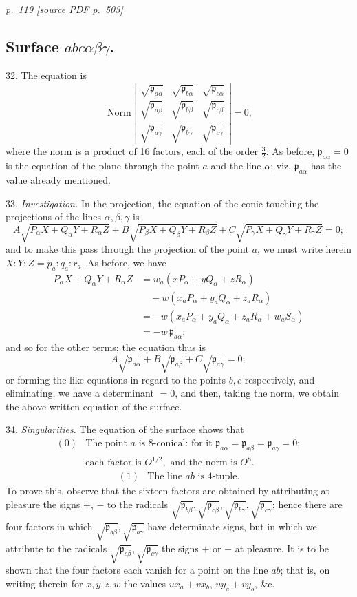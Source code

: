 \documentclass[11pt,a4paper]{article}
\newcommand{\sourcepage}[2]{%
  \bigskip
  \noindent\textit{p.~#1 [source PDF p.~#2]}%
  \par\smallskip
}
\newcommand{\p}{\mathfrak p}
\newcommand{\Norm}{\operatorname{Norm}}
\begin{document}
\sourcepage{119}{503}
\subsection*{Surface \(abc\alpha\beta\gamma\).}

32. The equation is
\[
\Norm\left|
\begin{array}{ccc}
\sqrt{\p_{a\alpha}}&\sqrt{\p_{b\alpha}}&\sqrt{\p_{c\alpha}}\\
\sqrt{\p_{a\beta}}&\sqrt{\p_{b\beta}}&\sqrt{\p_{c\beta}}\\
\sqrt{\p_{a\gamma}}&\sqrt{\p_{b\gamma}}&\sqrt{\p_{c\gamma}}
\end{array}\right|=0,
\]
where the norm is a product of 16 factors, each of the order $\frac32$. As before,
$\p_{a\alpha}=0$ is the equation of the plane through the point $a$ and the line
$\alpha$; viz. $\p_{a\alpha}$ has the value already mentioned.

33. \textit{Investigation.} In the projection, the equation of the conic touching the
projections of the lines $\alpha,\beta,\gamma$ is
\[
A\sqrt{P_\alpha X+Q_\alpha Y+R_\alpha Z}
+B\sqrt{P_\beta X+Q_\beta Y+R_\beta Z}
+C\sqrt{P_\gamma X+Q_\gamma Y+R_\gamma Z}=0;
\]
and to make this pass through the projection of the point $a$, we must write herein
$X:Y:Z=p_a:q_a:r_a$. As before, we have
\[
\begin{aligned}
P_\alpha X+Q_\alpha Y+R_\alpha Z
&=w_a(xP_\alpha+yQ_\alpha+zR_\alpha)\\
&\quad -w(x_aP_\alpha+y_aQ_\alpha+z_aR_\alpha)\\
&=-w(x_aP_\alpha+y_aQ_\alpha+z_aR_\alpha+w_aS_\alpha)\\
&=-w\,\p_{a\alpha};
\end{aligned}
\]
and so for the other terms; the equation thus is
\[
A\sqrt{\p_{a\alpha}}+B\sqrt{\p_{a\beta}}+C\sqrt{\p_{a\gamma}}=0;
\]
or forming the like equations in regard to the points $b,c$ respectively, and
eliminating, we have a determinant $=0$, and then, taking the norm, we obtain the
above-written equation of the surface.

34. \textit{Singularities.} The equation of the surface shows that
\[
\begin{array}{ll}
(0)&\text{The point }a\text{ is 8-conical: for it }
\p_{a\alpha}=\p_{a\beta}=\p_{a\gamma}=0;\\
&\text{each factor is }O^{1/2},\text{ and the norm is }O^8.
\end{array}
\]
\[
\begin{array}{ll}
(1)&\text{The line }ab\text{ is 4-tuple.}
\end{array}
\]
To prove this, observe that the sixteen factors are obtained by attributing at pleasure
the signs $+$, $-$ to the radicals
$\sqrt{\p_{b\beta}},\sqrt{\p_{c\beta}},\sqrt{\p_{b\gamma}},\sqrt{\p_{c\gamma}}$;
hence there are four factors in which $\sqrt{\p_{b\beta}},\sqrt{\p_{b\gamma}}$
have determinate signs, but in which we attribute to the radicals
$\sqrt{\p_{c\beta}},\sqrt{\p_{c\gamma}}$ the signs $+$ or $-$ at pleasure. It is to be
shown that the four factors each vanish for a point on the line $ab$; that is, on
writing therein for $x,y,z,w$ the values $ux_a+vx_b$, $uy_a+vy_b$, \&c.
\end{document}
